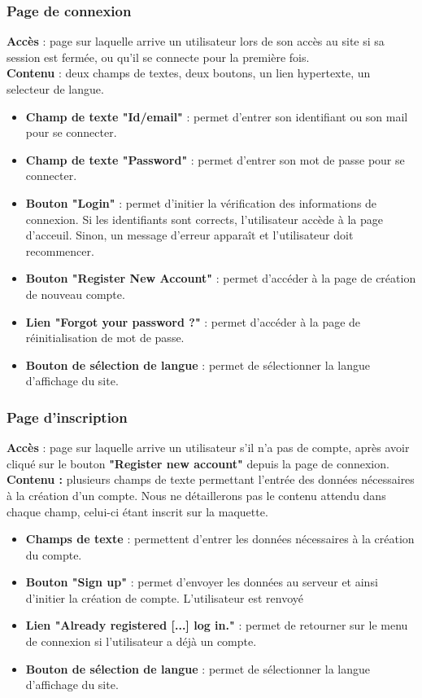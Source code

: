 \documentclass[../rapport.tex]{subfiles}
\begin{document}
\subsubsection{Page de connexion} 
\noindent \textbf{Accès} : page sur laquelle arrive un utilisateur lors de son accès au site si sa session est fermée, ou qu'il se connecte pour la première fois. \\
\textbf{Contenu} : deux champs de textes, deux boutons, un lien hypertexte, un selecteur de langue. 
\begin{itemize}
    \item \textbf{Champ de texte "Id/email"} : permet d'entrer son identifiant ou son mail pour se connecter.
    \item \textbf{Champ de texte "Password"} : permet d'entrer son mot de passe pour se connecter. 
    \item \textbf{Bouton "Login"} : permet d'initier la vérification des informations de connexion. Si les identifiants sont corrects, l'utilisateur accède à la page d'acceuil. Sinon, un message d'erreur apparaît et l'utilisateur doit recommencer.
    \item \textbf{Bouton "Register New Account"} : permet d'accéder à la page de création de nouveau compte.
    \item \textbf{Lien "Forgot your password ?"} : permet d'accéder à la page de réinitialisation de mot de passe.
    \item \textbf{Bouton de sélection de langue} : permet de sélectionner la langue d'affichage du site.
\end{itemize}

\subsubsection{Page d'inscription} 
\noindent \textbf{Accès} : page sur laquelle arrive un utilisateur s'il n'a pas de compte, après avoir cliqué sur le bouton \textbf{"Register new account"} depuis la page de connexion. \\
\textbf{Contenu :} plusieurs champs de texte permettant l'entrée des données nécessaires à la création d'un compte. Nous ne détaillerons pas le contenu attendu dans chaque champ, celui-ci étant inscrit sur la maquette.
\begin{itemize}
	\item \textbf{Champs de texte} : permettent d'entrer les données nécessaires à la création du compte.
	\item \textbf{Bouton "Sign up"} : permet d'envoyer les données au serveur et ainsi d'initier la création de compte. L'utilisateur est renvoyé 
    \item \textbf{Lien "Already registered [...] log in."} : permet de retourner sur le menu de connexion si l'utilisateur a déjà un compte.
    \item \textbf{Bouton de sélection de langue} : permet de sélectionner la langue d'affichage du site.
\end{itemize}
\end{document}
